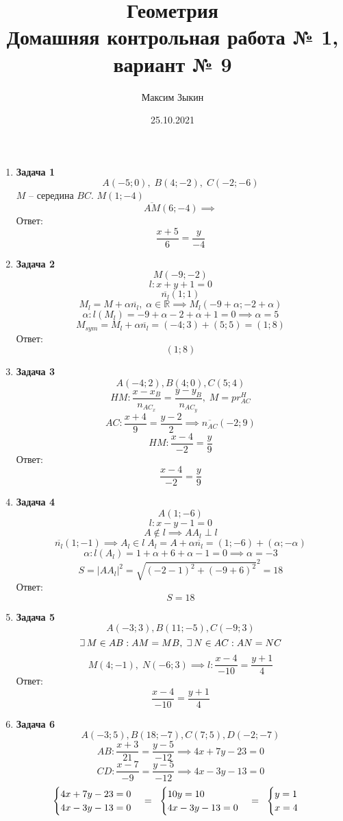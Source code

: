 \documentclass{article}
\title{%
  Геометрия \\
  \large Домашняя контрольная работа № 1, вариант № 9}
\author{Максим Зыкин}
\date{25.10.2021}
\theoremstyle{plain}
\def\letus{%
    \mathord{\setbox0=\hbox{$\exists$}%
             \hbox{\kern 0.125\wd0%
                   \vbox to \ht0{%
                      \hrule width 0.75\wd0%
                      \vfill%
                      \hrule width 0.75\wd0}%
                   \vrule height \ht0%
                   \kern 0.125\wd0}%
           }%
}
\begin{document}
\maketitle
\begin{enumerate}
\item \textbf{Задача 1}
$$A(-5; 0),\; B(4; -2),\; C(-2; -6)$$
$M$ -- середина $BC$. $M (1; -4)$
$$\overline{AM}(6; -4) \implies$$
Ответ:
$$\frac{x + 5}{6} = \frac{y}{-4}$$
\item \textbf{Задача 2}
$$M(-9; -2)$$
$$l: x + y + 1 = 0$$
$$\overline{n_{l}}(1; 1)$$
$$ M_l = M + \alpha\overline{n_l},\; \alpha \in \mathbb{R} \implies M_l (-9 + \alpha; -2 + \alpha)$$
$$\alpha: l(M_l) = -9 + \alpha - 2 + \alpha + 1 = 0 \implies \alpha = 5 $$
$$M_{sym} = M_l + \alpha\overline{n_l} = (-4; 3) + (5; 5) = (1; 8)$$
Ответ:
$$(1; 8)$$
\item \textbf{Задача 3}
$$A(-4; 2), B(4; 0), C(5; 4)$$
$$HM : \frac{x - x_B}{n_{AC_x}} = \frac{y - y_B}{n_{AC_y}},\; M = pr^{H}_{AC}$$
$$AC : \frac{x + 4}{9} = \frac{y - 2}{2}\implies \overline{n_{AC}}(-2; 9)$$
$$HM : \frac{x - 4}{-2} = \frac{y}{9}$$
Ответ:
$$\frac{x - 4}{-2} = \frac{y}{9}$$
\item \textbf{Задача 4}
$$A(1; -6)$$
$$l : x - y - 1 = 0$$
$$ A \not\in l \implies AA_l \perp l$$
$$\overline{n_l}(1; -1) \implies A_l \in l\; A_l = A + \alpha\overline{n_l} = (1; -6) + (\alpha; -\alpha)$$
$$\alpha: l(A_l) = 1 + \alpha + 6 + \alpha - 1 = 0 \implies \alpha = -3$$
$$S = |AA_l|^2 = \sqrt{(-2 - 1)^2 + (-9 + 6)^2}^2 = 18$$
Ответ: 
$$S = 18$$
\item \textbf{Задача 5}
$$A(-3; 3), B(11; -5), C(-9; 3)$$
$$\letus\, M \in AB: AM = MB,\; \letus\, N \in AC: AN = NC$$
$$M(4; -1),\; N(-6; 3) \implies l : \frac{x - 4}{-10} = \frac{y + 1}{4} $$
Ответ:
$$\frac{x - 4}{-10} = \frac{y + 1}{4}$$
\item \textbf{Задача 6}
$$A(-3; 5), B(18; -7), C(7; 5), D(-2; -7)$$
$$AB : \frac{x + 3}{21} = \frac{y - 5}{-12}\implies 4x + 7y - 23 = 0$$
$$CD : \frac{x - 7}{-9} = \frac{y - 5}{-12}\implies 4x - 3y - 13 = 0$$
\begin{equation}
    \begin{cases}
    4x + 7y - 23 = 0\\
    4x - 3y - 13 = 0
    \end {cases}
    = \hspace{2mm}
    \begin{cases}
    10y = 10\\
    4x - 3y - 13 = 0
    \end{cases}
    = \hspace{2mm}
    \begin{cases}
    y = 1\\
    x = 4
    \end{cases}
\end{equation}


\end{enumerate}
\end{document}
